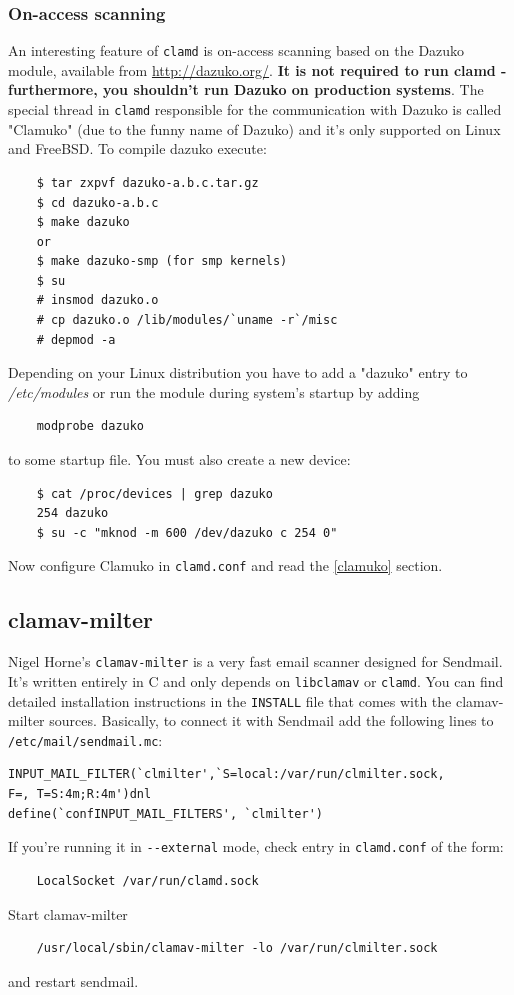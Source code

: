 \documentclass[a4paper,titlepage,12pt]{article}
\begin{document}
    \subsubsection{On-access scanning}
    An interesting feature of \verb+clamd+ is on-access scanning based on the
    Dazuko module, available from \url{http://dazuko.org/}. \textbf{It is not
    required to run clamd - furthermore, you shouldn't run Dazuko on production
    systems}. The special thread in \verb+clamd+ responsible for the
    communication with Dazuko is called "Clamuko" (due to the funny name of
    Dazuko) and it's only supported on Linux and FreeBSD. To compile dazuko
    execute:
    \begin{verbatim}
	$ tar zxpvf dazuko-a.b.c.tar.gz
	$ cd dazuko-a.b.c
	$ make dazuko
	or
	$ make dazuko-smp (for smp kernels)
	$ su
	# insmod dazuko.o
	# cp dazuko.o /lib/modules/`uname -r`/misc
	# depmod -a
    \end{verbatim}
    Depending on your Linux distribution you have to add a "dazuko" entry to
    \emph{/etc/modules} or run the module during system's startup by adding
    \begin{verbatim}
	modprobe dazuko
    \end{verbatim}
    to some startup file. You must also create a new device:
    \begin{verbatim}
	$ cat /proc/devices | grep dazuko
	254 dazuko
	$ su -c "mknod -m 600 /dev/dazuko c 254 0"
    \end{verbatim}
    Now configure Clamuko in \verb+clamd.conf+ and read the \ref{clamuko}
    section.

    \subsection{clamav-milter}
    Nigel Horne's \verb+clamav-milter+ is a very fast email scanner designed for
    Sendmail. It's written entirely in C and only depends on \verb+libclamav+
    or \verb+clamd+. You can find detailed installation instructions in the
    \verb+INSTALL+ file that comes with the clamav-milter sources. Basically,
    to connect it with Sendmail add the following lines to
    \verb+/etc/mail/sendmail.mc+:
    \begin{verbatim}
INPUT_MAIL_FILTER(`clmilter',`S=local:/var/run/clmilter.sock,
F=, T=S:4m;R:4m')dnl
define(`confINPUT_MAIL_FILTERS', `clmilter')
    \end{verbatim}
    If you're running it in \verb+--external+ mode, check entry in
    \verb+clamd.conf+ of the form:
    \begin{verbatim}
	LocalSocket /var/run/clamd.sock
    \end{verbatim}
    Start clamav-milter
    \begin{verbatim}
	/usr/local/sbin/clamav-milter -lo /var/run/clmilter.sock
    \end{verbatim}
    and restart sendmail.
\end{document}
